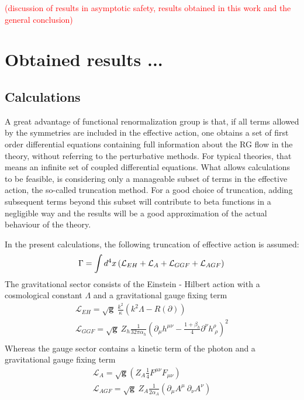 \documentclass[11pt, a4paper]{article}
\begin{document}
\textcolor{red}{(discussion of results in asymptotic safety, results obtained in this work and the general conclusion)} 

\section{Obtained results ...}

\subsection{Calculations}

A great advantage of functional renormalization group is that, if all terms
allowed by the symmetries are included in the effective action, one obtains a set of first order
differential equations containing full information about the RG flow in the theory, without referring to the perturbative methods.
For typical theories, that means an infinite set of coupled differential equations.
What allows calculations to be feasible, is considering only a manageable subset of terms in the effective action, the so-called truncation method.
For a good choice of truncation, adding subsequent terms beyond this subset will contribute to beta functions in a negligible way
and the results will be a good approximation of the actual behaviour of the theory.

In the present calculations, the following truncation of effective action is assumed:
\begin{equation}
    \Gamma = \int d^4 x \left( \mathcal{L}_{EH} + \mathcal{L}_A + \mathcal{L}_{GGF} + \mathcal{L}_{AGF} \right) \\
\end{equation}
The gravitational sector consists of the Einstein - Hilbert action with a cosmological constant $\Lambda$ and a gravitational gauge fixing term
\begin{gather}
    \mathcal{L}_{EH} = \sqrt{\mathbf{g}} \ \frac{k^2}{\kappa} \left( k^2 \Lambda - R(\partial)\right) \\
    \mathcal{L}_{GGF} = \sqrt{\mathbf{g}} \ Z_h \frac{1}{32 \pi \alpha_h} \left(\partial_\mu h^{\mu\nu} - \frac{1+\beta_h}{4} \partial^\nu h^\rho_{\; \rho} \right)^2\\
\end{gather}
Whereas the gauge sector contains a kinetic term of the photon
and a gravitational gauge fixing term
\begin{gather}
    \mathcal{L}_A =  \sqrt{\mathbf{g}} \left( Z_A \frac{1}{4} F^{\mu\nu} F_{\mu\nu} \right)\\%
    \mathcal{L}_{AGF} = \sqrt{\mathbf{g}} \ Z_A \frac{1}{2 \alpha_A} \left( \partial_\mu A^\mu \ \partial_\nu A^\nu \right) \\
\end{gather}
\end{document}
